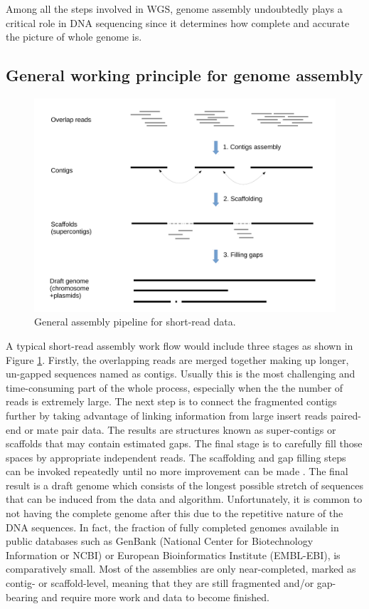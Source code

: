Among all the steps involved in WGS, genome assembly undoubtedly plays a critical role in DNA sequencing since it determines how complete and accurate the picture of whole genome is. 



\subsection{General working principle for genome assembly}

\begin{figure}[ht!]
\centering
\includegraphics[width=.9\textwidth]{images/sassembly.pdf}
\caption{General assembly pipeline for short-read data.}
\label{Fig:assembly}
\end{figure}

A typical short-read assembly work flow would include three stages as shown in Figure \ref{Fig:assembly}. Firstly, the overlapping reads are merged together making up longer, un-gapped sequences named as contigs. Usually this is the most challenging and time-consuming part of the whole process, especially when the the number of reads is extremely large. The next step is to connect the fragmented contigs further by taking advantage of linking information from large insert reads \EG{} paired-end or mate pair data. The results are structures known as super-contigs or scaffolds that may contain estimated gaps. The final stage is to carefully fill those spaces by appropriate independent reads. The scaffolding and gap filling steps can be invoked repeatedly until no more improvement can be made \cite{Tsai2010improving,Boetzer2012toward,Paulino2015sealer}. The final result is a draft genome which consists of the longest possible stretch of sequences that can be induced from the data and algorithm. Unfortunately, it is common to not having the complete genome after this due to the repetitive nature of the DNA sequences. In fact, the fraction of fully completed genomes available in public databases such as GenBank (National Center for Biotechnology Information or NCBI) or European Bioinformatics Institute (EMBL-EBI), is comparatively small. Most of the assemblies are only near-completed, marked as contig- or scaffold-level, meaning that they are still fragmented and/or gap-bearing and require more work and data to become finished. 

